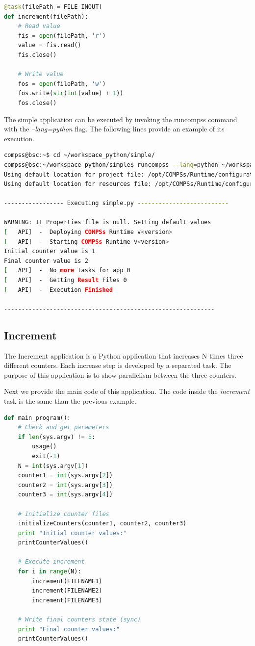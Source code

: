 \begin{lstlisting}[language=python]
@task(filePath = FILE_INOUT)
def increment(filePath):
    # Read value
    fis = open(filePath, 'r')
    value = fis.read()
    fis.close()

    # Write value
    fos = open(filePath, 'w')
    fos.write(str(int(value) + 1))
    fos.close()
\end{lstlisting}

The simple application can be executed by invoking the runcompss command with the \textit{--lang=python} flag. The following lines provide
an example of its execution.

\begin{lstlisting}[language=bash]
compss@bsc:~$ cd ~/workspace_python/simple/
compss@bsc:~/workspace_python/simple$ runcompss --lang=python ~/workspace_python/simple/simple.py 1
Using default location for project file: /opt/COMPSs/Runtime/configuration/xml/projects/project.xml
Using default location for resources file: /opt/COMPSs/Runtime/configuration/xml/resources/resources.xml

----------------- Executing simple.py --------------------------

WARNING: IT Properties file is null. Setting default values
[   API]  -  Deploying COMPSs Runtime v<version>
[   API]  -  Starting COMPSs Runtime v<version>
Initial counter value is 1
Final counter value is 2
[   API]  -  No more tasks for app 0
[   API]  -  Getting Result Files 0
[   API]  -  Execution Finished

------------------------------------------------------------
\end{lstlisting}

\subsection{Increment}
The Increment application is a Python application that increases N times three different counters. Each increase step is developed by a separated task. The
purpose of this application is to show parallelism between the three counters.

Next we provide the main code of this application. The code inside the \textit{increment} task is the same than the previous example. 

\begin{lstlisting}[language=python]
 def main_program():
    # Check and get parameters
    if len(sys.argv) != 5:
        usage()
        exit(-1)
    N = int(sys.argv[1])
    counter1 = int(sys.argv[2])
    counter2 = int(sys.argv[3])
    counter3 = int(sys.argv[4])

    # Initialize counter files
    initializeCounters(counter1, counter2, counter3)
    print "Initial counter values:"
    printCounterValues()

    # Execute increment
    for i in range(N):
        increment(FILENAME1)
        increment(FILENAME2)
        increment(FILENAME3)

    # Write final counters state (sync)
    print "Final counter values:"
    printCounterValues()
\end{lstlisting}

